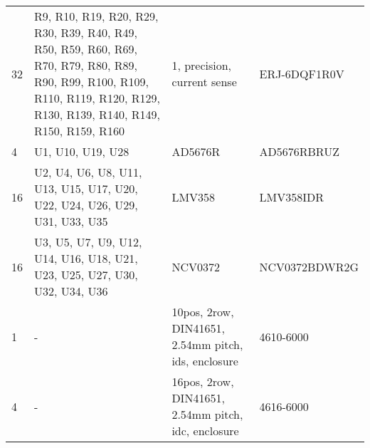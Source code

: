 \begin{longtable}[c]{@{} lp{5cm}p{5cm}l @{}}
    32  & R9, R10, R19, R20, R29, R30, R39, R40, R49, R50, R59, R60, R69, R70, R79, R80, R89, R90, R99, R100, R109, R110, R119, R120, R129, R130, R139, R140, R149, R150, R159, R160                                                                                                                                                                                               & 1, precision, current sense                         & ERJ-6DQF1R0V    \\
    4   & U1, U10, U19, U28                                                                                                                                                                                                                                                                                                                                                        & AD5676R                                             & AD5676RBRUZ     \\
    16  & U2, U4, U6, U8, U11, U13, U15, U17, U20, U22, U24, U26, U29, U31, U33, U35                                                                                                                                                                                                                                                                                               & LMV358                                              & LMV358IDR       \\
    16  & U3, U5, U7, U9, U12, U14, U16, U18, U21, U23, U25, U27, U30, U32, U34, U36                                                                                                                                                                                                                                                                                               & NCV0372                                             & NCV0372BDWR2G   \\
    \midrule
    1   & -                                                                                                                                                                                                                                                                                                                                                                        & 10pos, 2row, DIN41651, 2.54mm pitch, ids, enclosure & 4610-6000       \\
    4   & -                                                                                                                                                                                                                                                                                                                                                                        & 16pos, 2row, DIN41651, 2.54mm pitch, idc, enclosure & 4616-6000       \\

\end{longtable}
